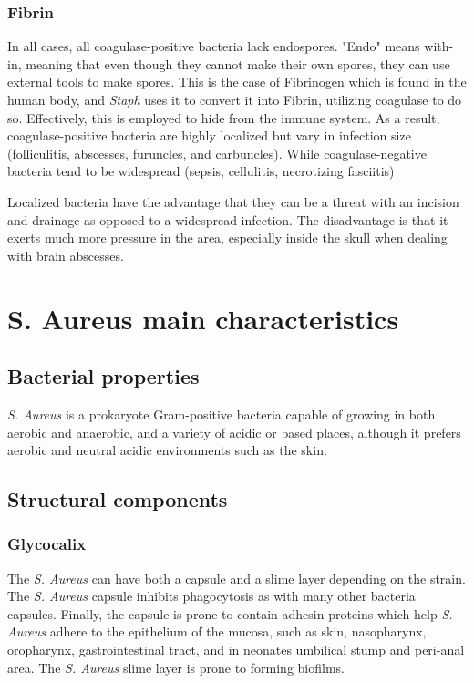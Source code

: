 \subsubsection{Fibrin}
\label{staph:Fibrin}

In all cases, all coagulase-positive bacteria lack endospores. "Endo" means with-in, meaning that even though they cannot make their own spores, they can use external tools to make spores. This is the case of Fibrinogen which is found in the human body, and \textit{Staph} uses it to convert it into Fibrin, utilizing coagulase to do so. Effectively, this is employed to hide from the immune system. As a result, coagulase-positive bacteria are highly localized but vary in infection size (folliculitis, abscesses, furuncles, and carbuncles). While coagulase-negative bacteria tend to be widespread (sepsis, cellulitis, necrotizing fasciitis)

Localized bacteria have the advantage that they can be a threat with an incision and drainage as opposed to a widespread infection. The disadvantage is that it exerts much more pressure in the area, especially inside the skull when dealing with brain abscesses.

\section{S. Aureus main characteristics}

\subsection{Bacterial properties}

\textit{S. Aureus} is a prokaryote Gram-positive bacteria capable of growing in both aerobic and anaerobic, and a variety of acidic or based places, although it prefers aerobic and neutral acidic environments such as the skin.

\subsection{Structural components}

\subsubsection{Glycocalix}

The \textit{S. Aureus} can have both a capsule and a slime layer depending on the strain. The \textit{S. Aureus} capsule inhibits phagocytosis as with many other bacteria capsules. Finally, the capsule is prone to contain adhesin proteins which help \textit{S. Aureus} adhere to the epithelium of the mucosa, such as skin, nasopharynx, oropharynx, gastrointestinal tract, and in neonates umbilical stump and peri-anal area. The \textit{S. Aureus} slime layer is prone to forming biofilms. \cite{Parastan2020}

